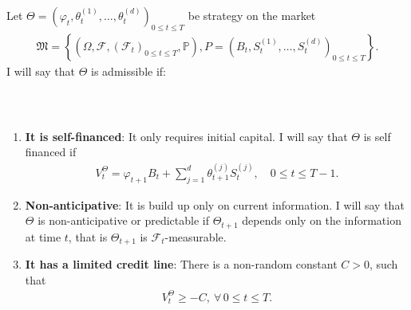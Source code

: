 \documentclass{beamer}
\numberwithin{equation}{section}
\begin{document}
\begin{frame}\frametitle{{\normalsize \secname} \\ {\large \subsecname}}
    \begin{definition}
        \begingroup
        Let $\Theta = \left(\varphi_t, \theta_t^{(1)}, \ldots, \theta_t^{(d)}\right)_{0 \leq t \leq T}$ be strategy on the market
        \begin{align}
            \mathfrak{M} =
            \left\{
                \left(
                    \Omega, 
                    \mathscr{F}, 
                    \left(
                        \mathscr{F}_t
                    \right)_{0 \leq t \leq T},
                    \mathbb{P}
                \right),
                P =
                \left(
                    B_t,
                    S_t^{(1)},
                    \ldots,
                    S_t^{(d)}
                \right)_{0 \leq t \leq T}
            \right\}.
        \end{align}
        I will say that $\Theta$ is admissible if:
        \endgroup
    \end{definition}
\end{frame}

\begin{frame}\frametitle{{\normalsize \secname} \\ {\large \subsecname}}
    \begin{enumerate}
        \item \textbf{It is self-financed}: It only requires initial capital.
        I will say that $\Theta$ is self financed if
        \begin{align}
            V_t^{\Theta} = \varphi_{t+1}B_t + \sum_{j=1}^d \theta_{t+1}^{(j)}S_t^{(j)}, \quad 0 \leq t \leq T-1. 
        \end{align}
        \item \textbf{Non-anticipative}: It is build up only on current information.
        I will say that $\Theta$ is non-anticipative or predictable if $\Theta_{t+1}$ depends only on the information at time $t$, that is $\Theta_{t+1}$ is $\mathscr{F}_t$-measurable.
        \item \textbf{It has a limited credit line}: There is a non-random constant $C > 0$, such that
        \begin{align}
            V_t^{\Theta} \geq -C, \ \forall \, 0 \leq t \leq T.
        \end{align}
    \end{enumerate}
\end{frame}
\end{document}
